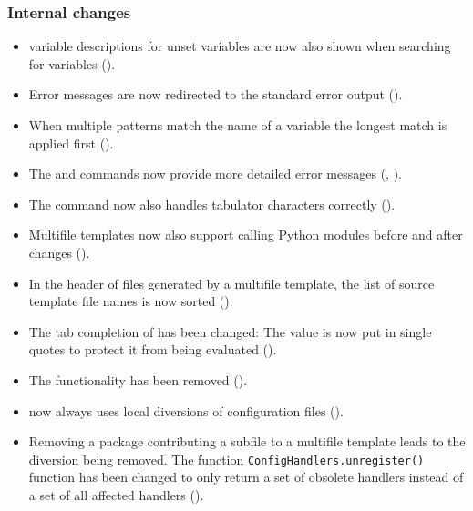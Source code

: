 \subsubsection{Internal changes}
\begin{itemize}
\item \ucsUCR{} variable descriptions for unset variables are now also
  shown when searching for variables ().
\item Error messages are now redirected to the standard error output
  ().
\item When multiple patterns match the name of a \ucsUCR{} variable the
  longest match is applied first ().
\item The  and
   commands now provide
  more detailed error messages (, ).
\item The  command now also handles
  tabulator characters correctly ().
\item Multifile templates now also support calling Python modules
  before and after changes ().
\item In the header of files generated by a multifile template, the
  list of source template file names is now sorted ().
\item The tab completion of  has been changed: The
  value is now put in single quotes to protect it from being evaluated
  ().
\item The  functionality has been removed
  ().
\item \ucsUCR{} now always uses local diversions of configuration
  files ().
\item Removing a package contributing a subfile to a multifile
  template leads to the diversion being removed. The function
  \texttt{ConfigHandlers.unregister()} function has been changed to
  only return a set of obsolete handlers instead of a set of all
  affected handlers ().
\end{itemize}


